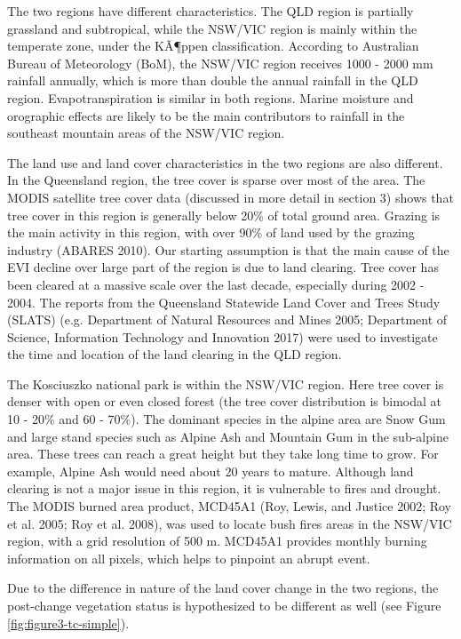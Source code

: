 \documentclass[fleqn,10pt,lineno]{wlpeerj} %
\begin{document}
The two regions have different characteristics. The QLD region is
partially grassland and subtropical, while the NSW/VIC region is mainly
within the temperate zone, under the KÃ¶ppen classification. According
to Australian Bureau of Meteorology (BoM), the NSW/VIC region receives
1000 - 2000 mm rainfall annually, which is more than double the annual
rainfall in the QLD region. Evapotranspiration is similar in both
regions. Marine moisture and orographic effects are likely to be the
main contributors to rainfall in the southeast mountain areas of the
NSW/VIC region.

The land use and land cover characteristics in the two regions are also
different. In the Queensland region, the tree cover is sparse over most
of the area. The MODIS satellite tree cover data (discussed in more
detail in section 3) shows that tree cover in this region is generally
below 20\% of total ground area. Grazing is the main activity in this
region, with over 90\% of land used by the grazing industry (ABARES
2010). Our starting assumption is that the main cause of the EVI decline
over large part of the region is due to land clearing. Tree cover has
been cleared at a massive scale over the last decade, especially during
2002 - 2004. The reports from the Queensland Statewide Land Cover and
Trees Study (SLATS) (e.g. Department of Natural Resources and Mines
2005; Department of Science, Information Technology and Innovation 2017)
were used to investigate the time and location of the land clearing in
the QLD region.

The Kosciuszko national park is within the NSW/VIC region. Here tree
cover is denser with open or even closed forest (the tree cover
distribution is bimodal at 10 - 20\% and 60 - 70\%). The dominant
species in the alpine area are Snow Gum and large stand species such as
Alpine Ash and Mountain Gum in the sub-alpine area. These trees can
reach a great height but they take long time to grow. For example,
Alpine Ash would need about 20 years to mature. Although land clearing
is not a major issue in this region, it is vulnerable to fires and
drought. The MODIS burned area product, MCD45A1 (Roy, Lewis, and Justice
2002; Roy et al. 2005; Roy et al. 2008), was used to locate bush fires
areas in the NSW/VIC region, with a grid resolution of 500 m. MCD45A1
provides monthly burning information on all pixels, which helps to
pinpoint an abrupt event.

Due to the difference in nature of the land cover change in the two
regions, the post-change vegetation status is hypothesized to be
different as well (see Figure \ref{fig:figure3-tc-simple}).
\end{document}
